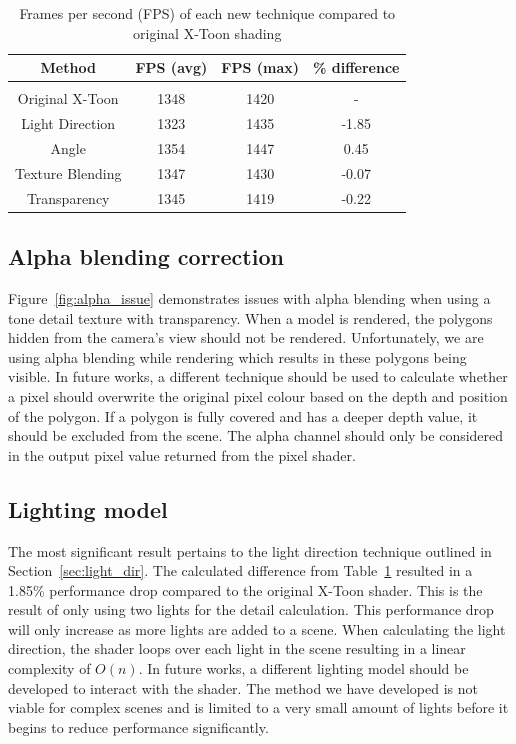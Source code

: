 \documentclass[annual]{acmsiggraph}
\begin{document}
\begin{table}
	\centering
	\caption{Frames per second (FPS) of each new technique compared to original X-Toon shading}
	\label{tab:fps}
	\begin{tabular}{cccc}
		\hline
    		Method  & FPS (avg) & FPS (max) & \% difference \\
		\hline\hline \\
    		Original X-Toon  & 1348 & 1420  & -                  \\
    		Light Direction & 1323 & 1435 & -1.85                \\
		Angle & 1354 & 1447 & 0.45 \\
		Texture Blending & 1347 & 1430 & -0.07 \\
		Transparency & 1345 & 1419 & -0.22 \\
		\hline
	\end{tabular}
\end{table}

\subsection{Alpha blending correction}
Figure~\ref{fig:alpha_issue} demonstrates issues with alpha blending when using a tone detail texture with transparency. When a model is rendered, the polygons hidden from the camera's view should not be rendered. Unfortunately, we are using alpha blending while rendering which results in these polygons being visible. In future works, a different technique should be used to calculate whether a pixel should overwrite the original pixel colour based on the depth and position of the polygon. If a polygon is fully covered and has a deeper depth value, it should be excluded from the scene. The alpha channel should only be considered in the output pixel value returned from the pixel shader.

\subsection{Lighting model}
The most significant result pertains to the light direction technique outlined in Section~\ref{sec:light_dir}. The calculated difference from Table~\ref{tab:fps} resulted in a 1.85\% performance drop compared to the original X-Toon shader. This is the result of only using two lights for the detail calculation. This performance drop will only increase as more lights are added to a scene. When calculating the light direction, the shader loops over each light in the scene resulting in a linear complexity of $O(n)$. In future works, a different lighting model should be developed to interact with the shader. The method we have developed is not viable for complex scenes and is limited to a very small amount of lights before it begins to reduce performance significantly. 
\end{document}
